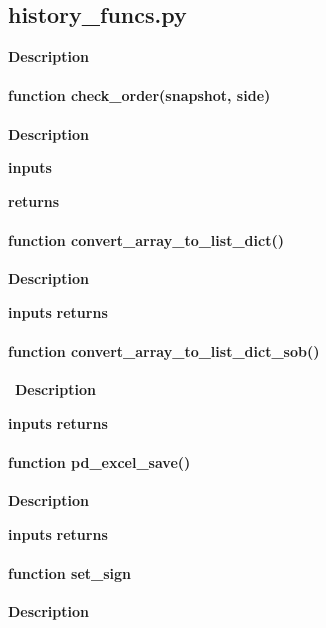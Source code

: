 \documentclass[refman]{article}
\begin{document}



	






%






\subsection{history\_funcs.py}\hfill \break
\noindent \textbf{Description}



\paragraph{\textbf{function} check\_order(snapshot, side)}\hfill\break
\noindent \textbf{Description}

\noindent \textbf{inputs}

\noindent \textbf{returns}

\paragraph{\textbf{function} convert\_array\_to\_list\_dict()}\hfill\break
\noindent \textbf{Description}

\textbf{inputs}
\textbf{returns}

\paragraph{\textbf{function} convert\_array\_to\_list\_dict\_sob()}\hfill\
\noindent \textbf{Description}

\textbf{inputs}
\textbf{returns}

\paragraph{\textbf{function} pd\_excel\_save()}\hfill\break
\noindent \textbf{Description}

\textbf{inputs}
\textbf{returns}

\paragraph{\textbf{function} set\_sign}\hfill\break
\noindent \textbf{Description}
\end{document}
